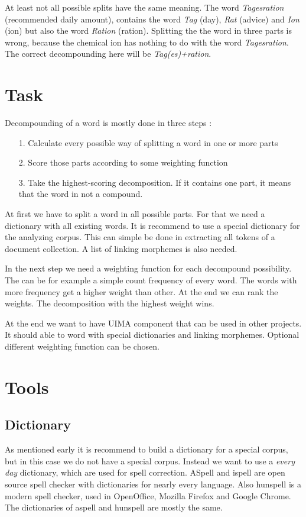 \documentclass[11pt, accentcolor=tud9b, nochapname]{tudexercise}
\begin{document}
At least not all possible splits have the same meaning. The word
\emph{Tagesration} (recommended daily amount), contains the word
\emph{Tag} (day), \emph{Rat} (advice) and \emph{Ion} (ion) but also
the word \emph{Ration} (ration). Splitting the the word in three
parts is wrong, because the chemical ion has nothing to do with the
word \emph{Tagesration}. The correct decompounding here will be
\emph{Tag(es)+ration}.

\section{Task}
Decompounding of a word is mostly done in three steps \cite{alf2008}:

\begin{enumerate}
\item[1.] Calculate every possible way of splitting a word in one or more
  parts
\item[2.] Score those parts according to some weighting function
\item[3.] Take the highest-scoring decomposition. If it contains one part,
  it means that the word in not a compound.
\end{enumerate}

At first we have to split a word in all possible parts. For that we
need a dictionary with all existing words. It is recommend to use a
special dictionary for the analyzing corpus. This can simple be done
in extracting all tokens of a document collection. A list of linking
morphemes is also needed.

In the next step we need a weighting function for each decompound
possibility. The can be for example a simple count frequency of every
word. The words with more frequency get a higher weight than other. At
the end we can rank the weights. The decomposition with the highest
weight wins.

At the end we want to have UIMA component that can be used in other
projects. It should able to word with special dictionaries and linking
morphemes. Optional different weighting function can be chosen.

\section{Tools}

\subsection{Dictionary}
As mentioned early it is recommend to build a dictionary for a special
corpus, but in this case we do not have a special corpus. Instead we
want to use a \emph{every day} dictionary, which are used for spell
correction. ASpell and ispell are open source spell checker with
dictionaries for nearly every language. Also hunspell is a modern
spell checker, used in OpenOffice, Mozilla Firefox and Google
Chrome. The dictionaries of aspell and hunspell are mostly the same.
\end{document}
